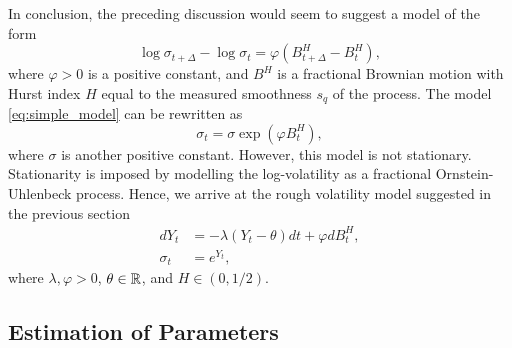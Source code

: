 In conclusion, the preceding discussion would seem to suggest a model of the form
\begin{equation}\label{eq:simple_model}
    \log \sigma_{t+\Delta} - \log \sigma_{t} = \varphi(B^{H}_{t+\Delta}-B^{H}_{t}),
\end{equation}
where $\varphi >0$ is a positive constant, and $B^{H}$ is a fractional Brownian motion with Hurst index $H$ equal to the measured smoothness $s_{q}$ of the process. The model \eqref{eq:simple_model} can be rewritten as 
\begin{equation}
    \sigma_{t}=\sigma \exp\left(\varphi B_{t}^{H}\right),
\end{equation}
where $\sigma$ is another positive constant. However, this model is not stationary. Stationarity is imposed by modelling the log-volatility as a fractional Ornstein-Uhlenbeck process. Hence, we arrive at the rough volatility model suggested in the previous section
\begin{align}
    dY_{t}&= -\lambda(Y_{t}-\theta)dt + \varphi dB^{H}_{t},\\
    \sigma_{t} &= e^{Y_{t}},
\end{align}
where $\lambda,\varphi>0$, $\theta\in \mathbb{R}$, and $H\in (0,1/2)$.
\subsection{Estimation of Parameters}

